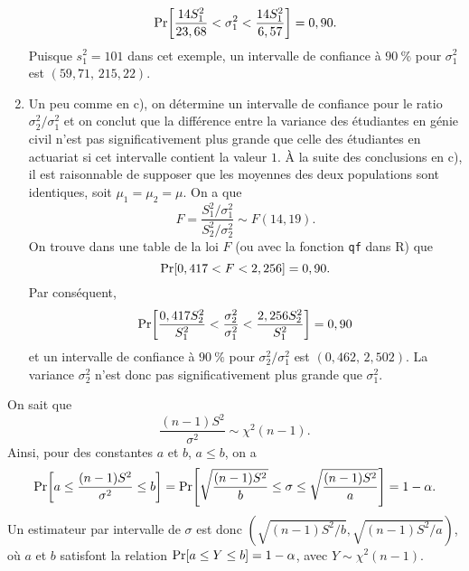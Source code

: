 \begin{solution}{5.5}
\begin{enumerate}
\begin{gather*}
        \mathrm{Pr}\! \left[ 
          \frac{14 S_1^2}{23,68} < \sigma_1^2 < \frac{14 S_1^2}{6,57}
         \right] = 0,90.
      \end{gather*}
      Puisque $s_1^2 = 101$ dans cet exemple, un intervalle de
      confiance à $90~\%$ pour $\sigma_1^2$ est $(59,71, \, 215,22)$.
    \item Un peu comme en c), on détermine un intervalle de confiance
      pour le ratio $\sigma_2^2/\sigma_1^2$ et on conclut que la
      différence entre la variance des étudiantes en génie civil n'est
      pas significativement plus grande que celle des étudiantes en
      actuariat si cet intervalle contient la valeur $1$. À la suite
      des conclusions en c), il est raisonnable de supposer que les
      moyennes des deux populations sont identiques, soit $\mu_1 =
      \mu_2 = \mu$. On a que
      \begin{displaymath}
        F = \frac{S_1^2/\sigma_1^2}{S_2^2/\sigma_2^2}
        \sim F(14, 19).
      \end{displaymath}
      On trouve dans une table de la loi $F$ (ou avec la fonction
      \texttt{qf} dans \textsf{R}) que
      \begin{displaymath}
        \mathrm{Pr}\! \left[ 0,417 < F < 2,256 \right] = 0,90.
      \end{displaymath}
      Par conséquent,
      \begin{displaymath}
        \mathrm{Pr}\! \left[ 
          \frac{0,417 S_2^2}{ S_1^2}
          < \frac{\sigma_2^2}{\sigma_1^2} <
          \frac{2,256 S_2^2}{ S_1^2}
         \right] = 0,90
      \end{displaymath}
      et un intervalle de confiance à $90~\%$ pour
      $\sigma_2^2/\sigma_1^2$ est $(0,462, \, 2,502)$. La variance
      $\sigma_2^2$ n'est donc pas significativement plus grande que
      $\sigma_1^2$.
    \end{enumerate}
  
\end{solution}
\begin{solution}{5.6}
    On sait que
    \begin{displaymath}
      \frac{(n-1)S^2}{\sigma^2} \sim \chi^2(n-1).
    \end{displaymath}
    Ainsi, pour des constantes $a$ et $b$, $a \leq b$, on a
    \begin{equation*}
      \mathrm{Pr}\! \left[ a \leq \frac{(n-1)S^2}{\sigma^2} \leq b \right] =
      \mathrm{Pr}\! \left[ \sqrt{\frac{(n-1)S^2}{b}} \leq \sigma \leq \sqrt{\frac{(n-1)S^2}{a}} \right] =
      1 - \alpha.
    \end{equation*}
    Un estimateur par intervalle de $\sigma$ est donc $(\sqrt{(n-1)
      S^2/b}, \sqrt{(n-1) S^2/a})$, où $a$ et $b$ satisfont la relation
    $\mathrm{Pr} [ a \leq Y \leq b ] = 1 - \alpha$, avec $Y \sim \chi^2(n - 1)$.
  
\end{solution}

